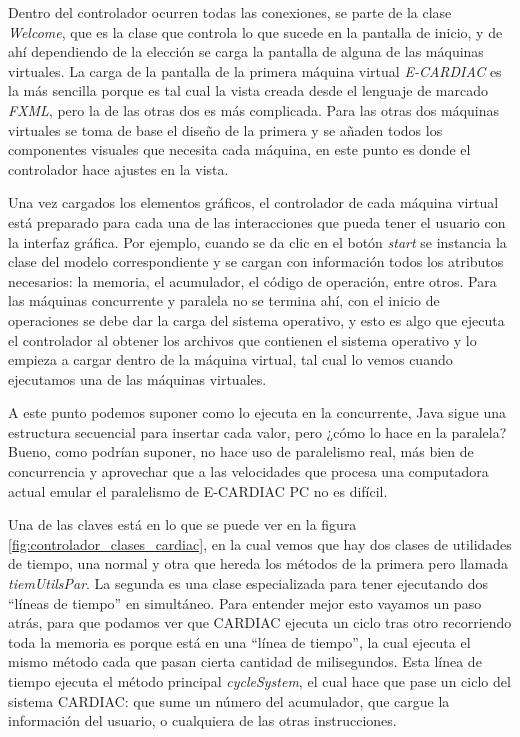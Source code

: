 \documentclass[letterpaper,12pt,oneside]{book}
\begin{document}
	
	Dentro del controlador ocurren todas las conexiones, se parte de la clase \textit{Welcome}, que es la clase que controla lo que sucede
	en la pantalla de inicio, y de ahí dependiendo de la elección se carga la pantalla de alguna de las máquinas virtuales. La carga
	de la pantalla de la primera máquina virtual \textit{E-CARDIAC} es la más sencilla porque es tal cual la vista creada desde
	el lenguaje de marcado \textit{FXML}, pero la de las otras dos es más complicada. Para las otras dos máquinas virtuales se toma
	de base el diseño de la primera y se añaden todos los componentes visuales que necesita cada máquina, en este punto es donde
	el controlador hace ajustes en la vista.
	
	Una vez cargados los elementos gráficos, el controlador de cada máquina virtual está preparado para cada una de las interacciones que pueda tener
	el usuario con la interfaz gráfica. Por ejemplo, cuando se da clic en el botón \textit{start} se instancia la clase del modelo
	correspondiente y se cargan con información todos los atributos necesarios: la memoria, el acumulador, el código de operación, entre otros. Para las máquinas
	concurrente y paralela no se termina ahí, con el inicio de operaciones se debe dar la carga del sistema operativo, y esto es algo que ejecuta el controlador al
	obtener los archivos que contienen el sistema operativo y lo empieza a cargar dentro de la máquina virtual, tal cual lo vemos cuando ejecutamos una de las
	máquinas virtuales.
	
	
	A este punto podemos suponer como lo ejecuta en la concurrente, Java sigue una estructura secuencial para insertar cada valor, pero ¿cómo lo hace
	en la paralela? Bueno, como podrían suponer, no hace uso de paralelismo real, más bien de concurrencia y aprovechar que a las velocidades
	que procesa una computadora actual emular el paralelismo de E-CARDIAC PC no es difícil.
	
	Una de las claves está en lo que se puede ver en la figura \ref{fig:controlador_clases_cardiac}, en la cual vemos que hay dos clases de utilidades
	de tiempo, una normal y otra que hereda los métodos de la primera pero llamada \textit{tiemUtilsPar}. La segunda es una clase especializada para
	tener ejecutando dos ``líneas de tiempo'' en simultáneo. Para entender mejor esto vayamos un paso atrás, para que podamos ver que CARDIAC ejecuta un
	ciclo tras otro recorriendo toda la memoria es porque está en una ``línea de tiempo'', la cual ejecuta el mismo método cada que pasan cierta cantidad de milisegundos.
	Esta línea de tiempo ejecuta el método principal \textit{cycleSystem}, el cual hace que pase un ciclo del sistema CARDIAC: que sume un número del acumulador, que
	cargue la información del usuario, o cualquiera de las otras instrucciones. 
	
\end{document}
